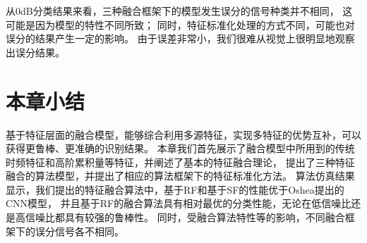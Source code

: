 从0dB分类结果来看，三种融合框架下的模型发生误分的信号种类并不相同，
这可能是因为模型的特性不同所致；
同时，特征标准化处理的方式不同，可能也对误分的结果产生一定的影响。
由于误差非常小，我们很难从视觉上很明显地观察出误分结果。

\section{本章小结}
基于特征层面的融合模型，能够综合利用多源特征，实现多特征的优势互补，可以获得更鲁棒、更准确的识别结果。
本章我们首先展示了融合模型中所用到的传统时频特征和高阶累积量等特征，并阐述了基本的特征融合理论，
提出了三种特征融合的算法模型，并提出了相应的算法框架下的特征标准化方法。
算法仿真结果显示，我们提出的特征融合算法中，基于RF和基于SF的性能优于Oshea提出的CNN模型，
并且基于RF的融合算法具有相对最优的分类性能，无论在低信噪比还是高信噪比都具有较强的鲁棒性。
同时，受融合算法特性等的影响，不同融合框架下的误分信号各不相同。
\par
